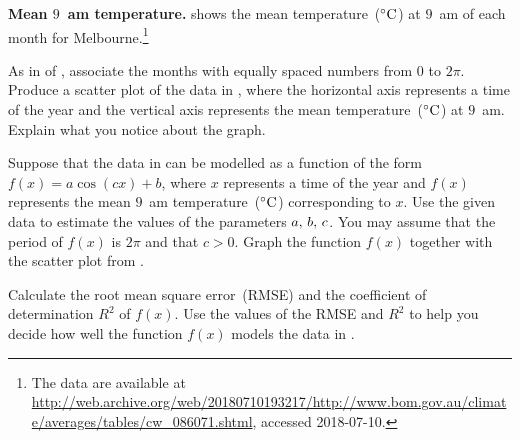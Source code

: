 \documentclass[a4paper,oneside,12pt]{article}
\begin{document}
\begin{table}[!htbp]
\centering

\caption{%
  The mean temperature~($\degreec{}$) at $9$~am of each month for the
  city of Melbourne, Victoria, Australia.  The mean was calculated
  using temperature data for the years from $1955$ to $2010$.  The
  mean temperatures are provided by the Bureau of Meteorology of
  Australia.
}
\label{tab:trigonometric:mean_9am_temperature}
\end{table}

\begin{exercise}
\textbf{Mean $9$~am temperature.}
 shows the mean
temperature~($\degreec{}$) at $9$~am of each month for
Melbourne.\footnote{
  The data are available at
  \url{http://web.archive.org/web/20180710193217/http://www.bom.gov.au/climate/averages/tables/cw_086071.shtml},
  accessed 2018-07-10.
}
\begin{packedenum}
\item\label{subex:trigonometric:mean_9am_temperature_graph}
  As in  of
  , associate the
  months with equally spaced numbers from $0$ to $2\pi$.  Produce a
  scatter plot of the data in
  , where the horizontal
  axis represents a time of the year and the vertical axis represents
  the mean temperature~($\degreec{}$) at $9$~am.  Explain what you
  notice about the graph.

\item\label{subex:trigonometric:mean_9am_temperature_model}
  Suppose that the data in
   can be modelled as a
  function of the form $f(x) = a \cos(cx) + b$, where $x$ represents a
  time of the year and $f(x)$ represents the mean $9$~am
  temperature~($\degreec{}$) corresponding to $x$.  Use the given data
  to estimate the values of the parameters ${a},\, {b},\, {c}$.  You
  may assume that the period of $f(x)$ is $2\pi$ and that $c > 0$.
  Graph the function $f(x)$ together with the scatter plot
  from .

\item\label{subex:trigonometric:mean_9am_temperature_assess}
  Calculate the root mean square error~(RMSE) and the coefficient of
  determination $R^2$ of $f(x)$.  Use the values of the RMSE and $R^2$
  to help you decide how well the function $f(x)$ models the data in
  .
\end{packedenum}
\end{exercise}
\end{document}
